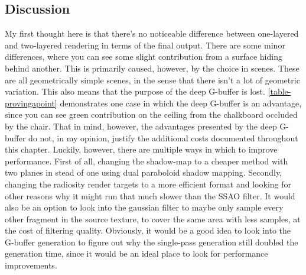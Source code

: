 \subsection{Discussion}
My first thought here is that there's no noticeable difference between one-layered and two-layered rendering in terms of the final output. There are some minor differences, where you can see some slight contribution from a surface hiding behind another. This is primarily caused, however, by the choice in scenes. These are all geometrically simple scenes, in the sense that there isn't a lot of geometric variation. This also means that the purpose of the deep G-buffer is lost. \ref{table-provingapoint} demonstrates one case in which the deep G-buffer is an advantage, since you can see green contribution on the ceiling from the chalkboard occluded by the chair. That in mind, however, the advantages presented by the deep G-buffer do not, in my opinion, justify the additional costs documented throughout this chapter. Luckily, however, there are multiple ways in which to improve performance. First of all, changing the shadow-map to a cheaper method with two planes in stead of one using dual paraboloid shadow mapping. Secondly, changing the radiosity render targets to a more efficient format and looking for other reasons why it might run that much slower than the SSAO filter. It would also be an option to look into the gaussian filter to maybe only sample every other fragment in the source texture, to cover the same area with less samples, at the cost of filtering quality. Obviously, it would be a good idea to look into the G-buffer generation to figure out why the single-pass generation still doubled the generation time, since it would be an ideal place to look for performance improvements.

